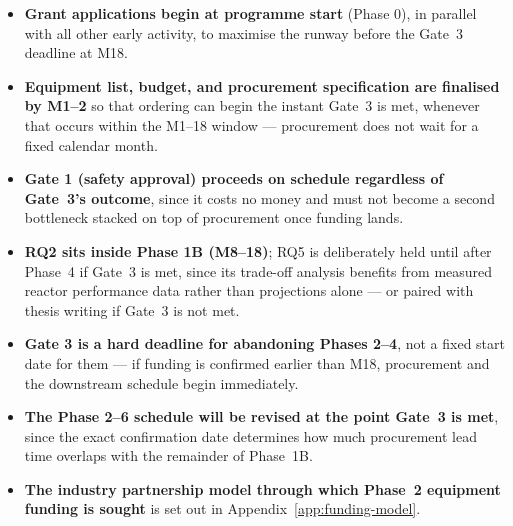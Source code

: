 \documentclass[12pt]{article}
\begin{document}
\begin{itemize}
    \item \textbf{Grant applications begin at programme start} (Phase 0),
          in parallel with all other early activity, to maximise the
          runway before the Gate~3 deadline at M18.
    \item \textbf{Equipment list, budget, and procurement specification
          are finalised by M1--2} so that ordering can begin the instant
          Gate~3 is met, whenever that occurs within the M1--18 window ---
          procurement does not wait for a fixed calendar month.
    \item \textbf{Gate 1 (safety approval) proceeds on schedule regardless
          of Gate~3's outcome}, since it costs no money and must not
          become a second bottleneck stacked on top of procurement once
          funding lands.
    \item \textbf{RQ2 sits inside Phase 1B (M8--18)}; RQ5 is deliberately
          held until after Phase~4 if Gate~3 is met, since its trade-off
          analysis benefits from measured reactor performance data rather
          than projections alone --- or paired with thesis writing if
          Gate~3 is not met.
    \item \textbf{Gate 3 is a hard deadline for abandoning Phases 2--4},
          not a fixed start date for them --- if funding is confirmed
          earlier than M18, procurement and the downstream schedule begin
          immediately.
    \item \textbf{The Phase 2--6 schedule will be revised at the point
          Gate~3 is met}, since the exact confirmation date determines how
          much procurement lead time overlaps with the remainder of
          Phase~1B.
    \item \textbf{The industry partnership model through which Phase~2
          equipment funding is sought} is set out in
          Appendix~\ref{app:funding-model}.
\end{itemize}
\end{document}

